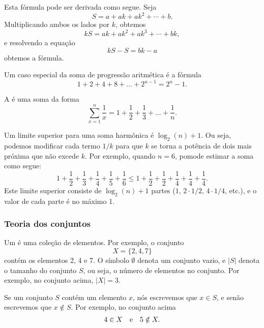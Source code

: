 Esta fórmula pode ser derivada como segue. Seja
\[ S = a + ak + ak^2 + \cdots + b .\]
Multiplicando ambos os lados por $k$, obtemos
\[ kS = ak + ak^2 + ak^3 + \cdots + bk,\]
e resolvendo a equação
\[ kS-S = bk-a\]
obtemos a fórmula.

Um caso especial da soma de progressão aritmética é a fórmula
\[1+2+4+8+\ldots+2^{n-1}=2^n-1.\]


A  é uma soma da forma
\[ \sum_{x=1}^n \frac{1}{x} = 1+\frac{1}{2}+\frac{1}{3}+\ldots+\frac{1}{n}.\]

Um limite superior para uma soma harmônica é $\log_2(n)+1$.
Ou seja, podemos modificar cada termo $1/k$ para que $k$ se torna
a potência de dois mais próxima que não excede $k$.
Por exemplo, quando $n=6$, pomode estimar a soma como segue:
\[ 1+\frac{1}{2}+\frac{1}{3}+\frac{1}{4}+\frac{1}{5}+\frac{1}{6} \le
1+\frac{1}{2}+\frac{1}{2}+\frac{1}{4}+\frac{1}{4}+\frac{1}{4}.\]
Este limite superior consiste de $\log_2(n)+1$ partes
($1$, $2 \cdot 1/2$, $4 \cdot 1/4$, etc.),
e o valor de cada parte é no máximo 1.

\subsubsection{Teoria dos conjuntos}


Um  é uma coleção de elementos.
Por exemplo, o conjunto
\[X=\{2,4,7\}\]
contém os elementos 2, 4 e 7.
O símbolo $\emptyset$ denota um conjunto vazio,
e $|S|$ denota o tamanho do conjunto $S$,
ou seja, o número de elementos no conjunto.
Por exemplo, no conjunto acima, $|X|=3$.

Se um conjunto $S$ contém um elemento $x$,
nós escrevemos que $x \in S$,
e senão escrevemos que $x \notin S$.
Por exemplo, no conjunto acima
\[4 \in X \hspace{10px}\textrm{e}\hspace{10px} 5 \notin X.\]

